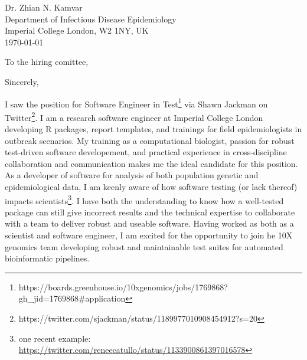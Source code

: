 


\clearpage
\begin{flushright}
  Dr. Zhian N. Kamvar\\
  Department of Infectious Disease Epidemiology\\
  Imperial College London, W2 1NY, UK\\
  \today
\end{flushright}

\date{\today} %
\opening{To the hiring comittee,}
\closing{Sincerely,} %


I saw the position for Software Engineer in
Test\footnote{https://boards.greenhouse.io/10xgenomics/jobs/1769868?gh_jid=1769868#application}
via Shawn Jackman on
Twitter\footnote{https://twitter.com/sjackman/status/1189977010908454912?s=20}.
I am a research software engineer at Imperial College London developing R
packages, report templates, and trainings for field epidemiologists in outbreak
scenarios. My training as a computational biologist, passion for robust
test-driven software developement, and practical experience in cross-discipline
collaboration and communication makes me the ideal candidate for this position.
As a developer of software for analysis of both population genetic and
epidemiological data, I am keenly aware of how software testing (or lack
thereof) impacts scientists\footnote{one recent example:
\url{https://twitter.com/reneecatullo/status/1133900861397016578}}. I have both
the understanding to know how a well-tested package can still give incorrect
results and the technical expertise to collaborate with a team to deliver
robust and useable software. Having worked as both as a scientist and software
engineer, I am excited for the opportunity to join he 10X genomics team
developing robust and maintainable test suites for automated bioinformatic
pipelines.


\vspace{1ex}


